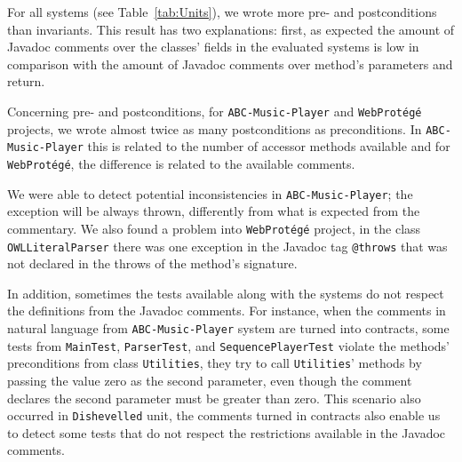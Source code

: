 For all systems (see Table~\ref{tab:Units}), we
wrote more pre- and postconditions than invariants. This result has two
explanations: first, as expected the amount of Javadoc comments over the
classes' fields in the evaluated systems is low in comparison with the amount
of Javadoc comments over method's parameters and return.


Concerning pre- and postconditions, for \texttt{ABC-Music-Player} and
\texttt{WebProt\'{e}g\'{e}} projects, we wrote almost twice as many postconditions
as preconditions.
In \texttt{ABC-Music-Player} this is related to the number of accessor methods
available and for \texttt{WebProt\'{e}g\'{e}}, the difference is related to
the available comments.
%


We were able to detect potential inconsistencies in \texttt{ABC-Mu\-sic-Player};
the exception will be always thrown, differently from what is expected from the
commentary.
We also found a problem into
\texttt{WebProt\'{e}g\'{e}} project, in the class \texttt{OWLLiteralParser} there was one exception
in the Javadoc tag \texttt{@throws} that was not declared in the throws of the method's signature.

In addition, sometimes the tests available along with the systems do
not respect the definitions from the Javadoc comments. For instance, when the
comments in natural language from \texttt{ABC-Music-Player} system are turned into
\contractjdoc{} contracts, some tests from
\texttt{MainTest}, \texttt{ParserTest}, and \texttt{SequencePlayerTest} violate
the methods' preconditions from class \texttt{Utilities}, they try to
call \texttt{Utilities}' methods by passing the value zero as the second
parameter, even though the comment declares the second parameter must be greater than zero.
This scenario also occurred in \texttt{Dishevelled} unit, the comments turned
in \contractjdoc{} contracts also enable us to detect some tests
that do not respect the restrictions available in the Javadoc comments.


